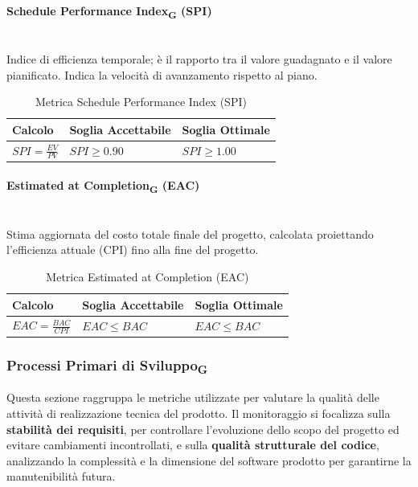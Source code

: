 \documentclass[11pt,a4paper]{article}
\newcommand{\gls}[1]{#1\textsubscript{G}}
\begin{document}
\paragraph{Schedule Performance Index\textsubscript{G} (SPI)} \hfill \\
Indice di efficienza temporale; è il rapporto tra il valore guadagnato e il valore pianificato. Indica la velocità di avanzamento rispetto al piano.

\begin{table}[H]
    \centering
    \renewcommand{\arraystretch}{1.5}
    \begin{tabular}{|M{0.4\textwidth}|M{0.25\textwidth}|M{0.25\textwidth}|}
        \hline
        \textbf{Calcolo} & \textbf{Soglia Accettabile} & \textbf{Soglia Ottimale} \\
        \hline
        $SPI = \frac{EV}{PV}$ & $SPI \ge 0.90$ & $SPI \ge 1.00$ \\
        \hline
    \end{tabular}
    \caption{Metrica Schedule Performance Index (SPI)}
\end{table}

\paragraph{Estimated at Completion\textsubscript{G} (EAC)} \hfill \\
Stima aggiornata del costo totale finale del progetto, calcolata proiettando l'efficienza attuale (CPI) fino alla fine del progetto.

\begin{table}[H]
    \centering
    \renewcommand{\arraystretch}{1.5}
    \begin{tabular}{|M{0.4\textwidth}|M{0.25\textwidth}|M{0.25\textwidth}|}
        \hline
        \textbf{Calcolo} & \textbf{Soglia Accettabile} & \textbf{Soglia Ottimale} \\
        \hline
        $EAC = \frac{BAC}{CPI}$ & $EAC \le BAC$ & $EAC \le BAC$ \\
        \hline
    \end{tabular}
    \caption{Metrica Estimated at Completion (EAC)}
\end{table}

\newpage
\subsubsection{\gls{Processi Primari di Sviluppo}}
Questa sezione raggruppa le metriche utilizzate per valutare la qualità delle attività di realizzazione tecnica del prodotto.
Il monitoraggio si focalizza sulla \textbf{stabilità dei requisiti}, per controllare l'evoluzione dello scopo del progetto ed evitare cambiamenti incontrollati, e sulla \textbf{qualità strutturale del codice}, analizzando la complessità e la dimensione del software prodotto per garantirne la manutenibilità futura.
\end{document}
